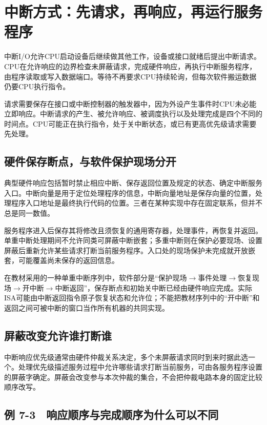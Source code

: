 \section{中断方式：先请求，再响应，再运行服务程序}\label{CO07-interrupt}

中断I/O允许CPU启动设备后继续做其他工作，设备或接口就绪后提出中断请求。CPU在允许响应的边界检查未屏蔽请求，完成硬件响应，再执行中断服务程序，由程序读取或写入数据端口。等待不再要求CPU持续轮询，但每次软件搬运数据仍要CPU执行指令。

请求需要保存在接口或中断控制器的触发器中，因为外设产生事件时CPU未必能立即响应。中断请求的产生、被允许响应、被调度执行以及处理完成是四个不同的时间点。CPU可能正在执行指令，处于关中断状态，或已有更高优先级请求需要先处理。

\subsection{硬件保存断点，与软件保护现场分开}\label{CO07-entry}

典型硬件响应包括暂时禁止相应中断、保存返回位置及规定的状态、确定中断服务入口。中断向量是用于定位处理程序的信息，中断向量地址是保存向量的位置，处理程序入口地址是最终执行代码的位置。三者在某种实现中存在固定联系，但并不总是同一数值。

服务程序进入后保存其将修改且须恢复的通用寄存器，处理事件，再恢复并返回。单重中断处理期间不允许同类可屏蔽中断嵌套；多重中断则在保护必要现场、设置屏蔽后重新允许某些请求打断当前服务程序。入口处的现场保护未完成就开放嵌套，可能覆盖尚未保存的返回信息。

在教材采用的一种单重中断序列中，软件部分是“保护现场\ensuremath{\to}事件处理\ensuremath{\to}恢复现场\ensuremath{\to}开中断\ensuremath{\to}中断返回”，保存断点和初始关中断已经由硬件响应完成。实际ISA可能由中断返回指令原子恢复状态和允许位；不能把教材序列中的“开中断”和返回之间可被中断的窗口当作所有机器的共同实现。

\subsection{屏蔽改变允许谁打断谁}\label{CO07-mask}

中断响应优先级通常由硬件仲裁关系决定，多个未屏蔽请求同时到来时据此选一个。处理优先级描述服务过程中允许哪些请求打断当前服务，可由各服务程序设置的屏蔽字确定。屏蔽会改变参与本次仲裁的集合，不会把仲裁电路本身的固定比较顺序改写。

\subsection{例 7-3　响应顺序与完成顺序为什么可以不同}\label{CO07-example-3}

